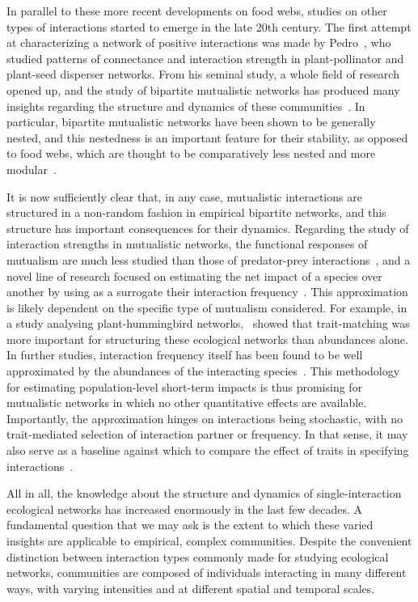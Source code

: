 In parallel to these more recent developments on food webs, studies on other types of interactions started to emerge in the late 20th century. The first attempt at characterizing a network of positive interactions was made by Pedro~\citet{Jordano1987}, who studied patterns of connectance and interaction strength in plant-pollinator and plant-seed disperser networks. From his seminal study, a whole field of research opened up, and the study of bipartite mutualistic networks has produced many insights regarding the structure and dynamics of these communities~\citep{Vazquez2009a, Bascompte2013}. In particular, bipartite mutualistic networks have been shown to be generally nested, and this nestedness is an important feature for their stability, as opposed to food webs, which are thought to be comparatively less nested and more modular~\citep{Thebault2010}.

It is now sufficiently clear that, in any case, mutualistic interactions are structured in a non-random fashion in empirical bipartite networks, and this structure has important consequences for their dynamics. Regarding the study of interaction strengths in mutualistic networks, the functional responses of mutualism are much less studied than those of predator-prey interactions~\citep{Holland2002}, and a novel line of research focused on estimating the net impact of a species over another by using as a surrogate their interaction frequency~\citep{Vazquez2005}. This approximation is likely dependent on the specific type of mutualism considered. For example, in a study analysing plant-hummingbird networks,~\cite{Vizentin-Bugoni2014} showed that trait-matching was more important for structuring these ecological networks than abundances alone. In further studies, interaction frequency itself has been found to be well approximated by the abundances of the interacting species~\citep{Vazquez2007}. This methodology for estimating population-level short-term impacts is thus promising for mutualistic networks in which no other quantitative effects are available. Importantly, the approximation hinges on interactions being stochastic, with no trait-mediated selection of interaction partner or frequency. In that sense, it may also serve as a baseline against which to compare the effect of traits in specifying interactions~\citep{Poisot2015}.

All in all, the knowledge about the structure and dynamics of single-interaction ecological networks has increased enormously in the last few decades. A fundamental question that we may ask is the extent to which these varied insights are applicable to empirical, complex communities. Despite the convenient distinction between interaction types commonly made for studying ecological networks, communities are composed of individuals interacting in many different ways, with varying intensities and at different spatial and temporal scales.

